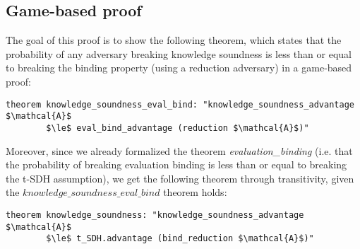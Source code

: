 \subsection{Game-based proof}
\label{security:knowledge:gamebased}
The goal of this proof is to show the following theorem, which states that the probability of any adversary breaking  knowledge soundness is less than or equal to breaking the binding property (using a reduction adversary) in a game-based proof:
\begin{lstlisting}[language=isabelle]
    theorem knowledge_soundness_eval_bind: "knowledge_soundness_advantage $\mathcal{A}$ 
        $\le$ eval_bind_advantage (reduction $\mathcal{A}$)"
\end{lstlisting}
Moreover, since we already formalized the theorem \textit{evaluation\_binding} (i.e. that the probability of breaking evaluation binding is less than or equal to breaking the t-SDH assumption), we get the following theorem through transitivity, given the $knowledge\_soundness\_eval\_bind$ theorem holds: 

\begin{lstlisting}[language=isabelle]
    theorem knowledge_soundness: "knowledge_soundness_advantage $\mathcal{A}$ 
        $\le$ t_SDH.advantage (bind_reduction $\mathcal{A}$)"
\end{lstlisting}

